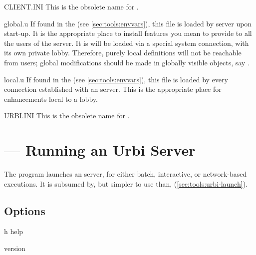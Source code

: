 \begin{files}
\item[CLIENT.INI] This is the obsolete name for .

\item[global.u] If found in the  (see
  \autoref{sec:tools:envvars}), this file is loaded by \urbi server upon
  start-up.  It is the appropriate place to install features you
  mean to provide to all the users of the server.  It is will be
  loaded via a special system connection, with its own private lobby.
  Therefore, purely local definitions will not be reachable from
  users; global modifications should be made in globally visible
  objects, say .

\item[local.u] If found in the  (see
  \autoref{sec:tools:envvars}), this file is loaded by every
  connection established with an \urbi server.  This is the
  appropriate place for enhancements local to a lobby.

\item[URBI.INI] This is the obsolete name for .
\end{files}

\section{ --- Running an Urbi Server}
\label{sec:tools:urbi}

The  program launches an \urbi server, for either batch,
interactive, or network-based executions.  It is subsumed by, but
simpler to use than, 
(\autoref{sec:tools:urbi-launch}).

\subsection{Options}

\begin{options}
\item[h]{help} \optionHelp
\item{version} \optionVersion
\end{options}

